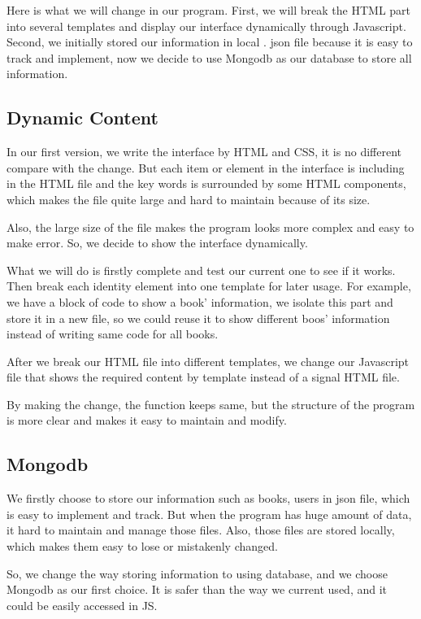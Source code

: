 \documentclass[12pt]{article}
\begin{document}
	Here is what we will change in our program. First, we will break the HTML part into several templates and display our interface dynamically through Javascript. Second, we initially stored our information in local . json file because it is easy to track and implement, now we decide to use Mongodb as our database to store all information.


	\subsection{Dynamic Content}
	In our first version, we write the interface by HTML and CSS, it is no different compare with the change. But each item or element in the interface is including in the HTML file and the key words is surrounded by some HTML components, which makes the file quite large and hard to maintain because of its size.

	Also, the large size of the file makes the program looks more complex and easy to make error. So, we decide to show the interface dynamically.

	What we will do is firstly complete and test our current one to see if it works. Then break each identity element into one template for later usage. For example, we have a block of code to show a book’ information, we isolate this part and store it in a new file, so we could reuse it to show different boos’ information instead of writing same code for all books.

	After we break our HTML file into different templates, we change our Javascript file that shows the required content by template instead of a signal HTML file.

	By making the change, the function keeps same, but the structure of the program is more clear and makes it easy to maintain and modify.


	\subsection{Mongodb}
	 We firstly choose to store our information such as books, users in json file, which is easy to implement and track. But when the program has huge amount of data, it hard to maintain and manage those files. Also, those files are stored locally, which makes them easy to lose or mistakenly changed.

	So, we change the way storing information to using database, and we choose Mongodb as our first choice. It is safer than the way we current used, and it could be easily accessed in JS.
\end{document}
